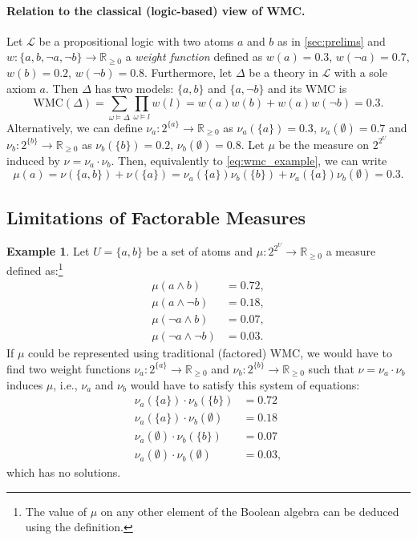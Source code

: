 \documentclass{article}
\theoremstyle{definition}
\newtheorem{example}{Example}
\theoremstyle{remark}
\begin{document}
{\paragraph{Relation to the classical (logic-based) view of WMC.} Let
$\mathcal{L}$ be a propositional logic with two atoms $a$ and $b$ as in
\cref{sec:prelims} and $w\colon \{ a, b, \neg a, \neg b \} \to \mathbb{R}_{\ge
  0}$ a \emph{weight function} defined as $w(a) = 0.3$, $w(\neg a) = 0.7$, $w(b)
= 0.2$, $w(\neg b) = 0.8$. Furthermore, let $\Delta$ be a theory in
$\mathcal{L}$ with a sole axiom $a$. Then $\Delta$ has two models: $\{ a, b \}$
and $\{ a, \neg b \}$ and its WMC \cite{DBLP:journals/ai/ChaviraD08} is
\begin{equation} \label{eq:wmc_example}
  \mathrm{WMC}(\Delta) = \sum_{\omega \models \Delta} \prod_{\omega \models l} w(l) = w(a)w(b) + w(a)w(\neg b) = 0.3.
\end{equation}
Alternatively, we can define $\nu_a\colon 2^{\{a\}} \to \mathbb{R}_{\ge 0}$ as
$\nu_a(\{ a \}) = 0.3$, $\nu_a(\emptyset) = 0.7$ and $\nu_b\colon 2^{\{b\}} \to
\mathbb{R}_{\ge 0}$ as $\nu_b(\{ b \}) = 0.2$, $\nu_b(\emptyset) = 0.8$. Let
$\mu$ be the measure on $2^{2^U}$ induced by $\nu = \nu_a \cdot \nu_b$. Then,
equivalently to \cref{eq:wmc_example}, we can write
\[
  \mu(a) = \nu(\{ a, b \}) + \nu(\{ a \}) = \nu_a(\{a\})\nu_b(\{b\}) +
  \nu_a(\{a\})\nu_b(\emptyset) = 0.3.
\]

\subsection{Limitations of Factorable Measures}

\begin{example}
  Let $U = \{a, b\}$ be a set of atoms and $\mu\colon 2^{2^U} \to
  \mathbb{R}_{\ge 0}$ a measure defined as:\footnote{The value of $\mu$ on any
    other element of the Boolean algebra can be deduced using the definition.}
  \begin{align*}
    \mu(a \land b) &= 0.72, \\
    \mu(a \land \neg b) &= 0.18, \\
    \mu(\neg a \land b) &= 0.07, \\
    \mu(\neg a \land \neg b) &= 0.03.
  \end{align*}
  If $\mu$ could be represented using traditional (factored) WMC, we would have
  to find two weight functions $\nu_a\colon 2^{\{a\}} \to \mathbb{R}_{\ge 0}$
  and $\nu_b\colon 2^{\{b\}} \to \mathbb{R}_{\ge 0}$ such that $\nu = \nu_a
  \cdot \nu_b$ induces $\mu$, i.e., $\nu_a$ and $\nu_b$ would have to satisfy
  this system of equations:
  \begin{align*}
    \nu_a(\{a\}) \cdot \nu_b(\{b\}) &= 0.72 \\
    \nu_a(\{a\}) \cdot \nu_b(\emptyset) &= 0.18 \\
    \nu_a(\emptyset) \cdot \nu_b(\{b\}) &= 0.07 \\
    \nu_a(\emptyset) \cdot \nu_b(\emptyset) &= 0.03,
  \end{align*}
  which has no solutions.


\end{example}}
\end{document}
